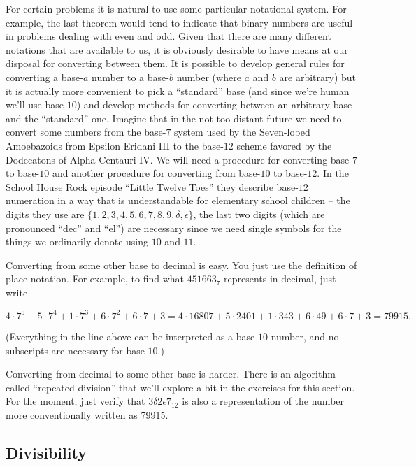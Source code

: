 For certain problems it is natural to use some particular notational system.
For example, the
last theorem would tend to indicate that binary numbers are useful
in problems dealing with even and odd.  Given that there are many different 
notations that are available to us, it is obviously desirable to have 
means at our disposal for converting between them.  It is possible to 
develop general rules for converting a base-$a$ number to a base-$b$ 
number (where $a$ and $b$ are arbitrary) but it is actually more convenient 
to pick a ``standard'' base (and since we're human we'll use base-$10$) 
and develop methods for converting between an arbitrary base and the 
``standard'' one.  Imagine that in the not-too-distant future we need to 
convert some numbers from the base-$7$ system used by the Seven-lobed 
Amoebazoids from Epsilon Eridani III to the base-$12$ scheme favored 
by the Dodecatons of Alpha-Centauri IV.  We will need a procedure
for converting base-$7$ to base-$10$ and another procedure for converting 
from base-$10$ to base-$12$.  In the School House Rock episode 
``Little Twelve Toes'' they describe base-$12$
numeration in a way that is understandable for elementary school 
children -- the digits they use are 
$\{1, 2, 3, 4, 5, 6, 7, 8, 9, \delta, \epsilon \}$, the last two digits 
(which are pronounced ``dec'' and ``el'') are necessary since we need 
single symbols for the things we ordinarily denote using $10$ and $11$.

Converting from some other base to decimal is easy.  You just use the 
definition of place notation.  For example, to find what $451663_7$ 
represents in decimal, just write

\[ 4 \cdot 7^5 + 5 \cdot 7^4 + 1 \cdot 7^3 + 6 \cdot 7^2 + 6 \cdot 7 + 3 =  4 \cdot 16807 + 5 \cdot 2401 + 1 \cdot 343 + 6 \cdot 49 + 6 \cdot 7 + 3 = 79915. \] 

(Everything in the line above can be interpreted as a base-$10$ number, 
and no subscripts are necessary for base-$10$.)

Converting from decimal to some other base is harder.  There is an algorithm 
called ``repeated division'' that we'll explore a bit in the exercises 
for this section.  For the moment, just verify that 
$3\delta 2\epsilon 7_{12}$ is also a representation of the
number more conventionally written as 79915.

\subsection{Divisibility}
\label{div}

